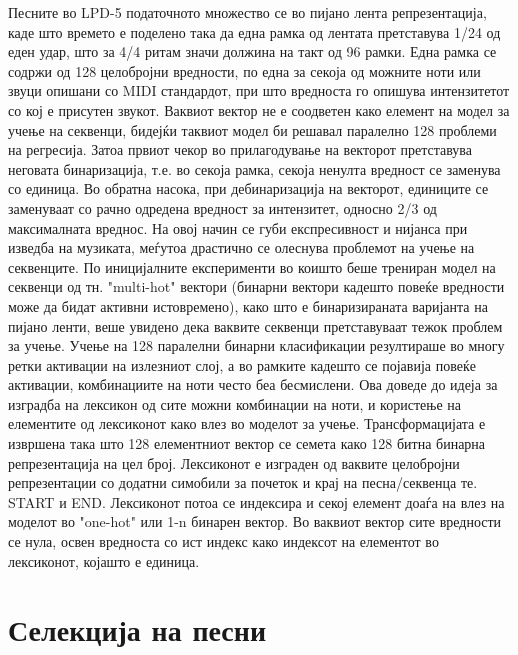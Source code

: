 Песните во LPD-5 податочното множество се во пијано лента репрезентација, каде што времето е поделено така да една рамка од лентата претставува 1/24 од еден удар, што за 4/4 ритам значи должина на такт од 96 рамки. Една рамка се содржи од 128 целобројни вредности, по една за секоја од можните ноти или звуци опишани со MIDI стандардот, при што вредноста го опишува интензитетот со кој е присутен звукот. Ваквиот вектор не е соодветен како елемент на модел за учење на секвенци, бидејќи таквиот модел би решавал паралелно 128 проблеми на регресија. Затоа првиот чекор во прилагодување на векторот претставува неговата бинаризација, т.е. во секоја рамка, секоја ненулта вредност се заменува со единица. Во обратна насока, при дебинаризација на векторот, единиците се заменуваат со рачно одредена вредност за интензитет, односно 2/3 од максималната вреднос. На овој начин се губи експресивност и нијанса при изведба на музиката, меѓутоа драстично се олеснува проблемот на учење на секвенците. 
По иницијалните експерименти во коишто беше трениран модел на секвенци од тн. "multi-hot" вектори (бинарни вектори кадешто повеќе вредности може да бидат активни истовремено), како што е бинаризираната варијанта на пијано ленти, веше увидено дека ваквите секвенци претставуваат тежок проблем за учење. Учење на 128 паралелни бинарни класификации резултираше во многу ретки активации на излезниот слој, а во рамките кадешто се појавија повеќе активации, комбинациите на ноти често беа бесмислени. Ова доведе до идеја за изградба на лексикон од сите можни комбинации на ноти, и користење на елементите од лексиконот како влез во моделот за учење. Трансформацијата е извршена така што 128 елементниот вектор се семета како 128 битна бинарна репрезентација на цел број. Лексиконот е изграден од ваквите целобројни репрезентации со додатни симобили за почеток и крај на песна/секвенца те. START и END. Лексиконот потоа се индексира и секој елемент доаѓа на влез на моделот во "one-hot" или 1-n бинарен вектор. Во ваквиот вектор сите вредности се нула, освен вредноста со ист индекс како индексот на елементот во лексиконот, којашто е единица.

\section{Селекција на песни}

